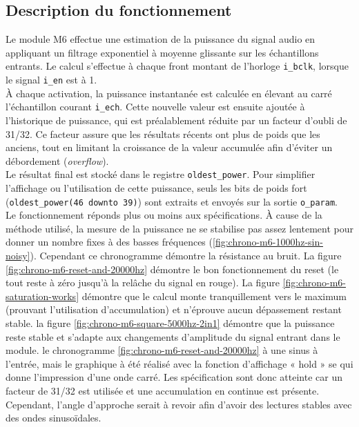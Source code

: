 

\subsection{Description du fonctionnement}

Le module M6 effectue une estimation de la puissance du signal audio en
appliquant un filtrage exponentiel à moyenne glissante sur les échantillons
entrants. Le calcul s'effectue à chaque front montant de l'horloge
\verb|i_bclk|, lorsque le signal \verb|i_en| est à 1. \\

À chaque activation, la puissance instantanée est calculée en élevant au
carré l'échantillon courant \verb|i_ech|. Cette nouvelle valeur est ensuite
ajoutée à l'historique de puissance, qui est préalablement réduite par un
facteur d'oubli de 31/32. Ce facteur assure que les résultats récents ont
plus de poids que les anciens, tout en limitant la croissance de la valeur
accumulée afin d'éviter un débordement (\emph{overflow}). \\

Le résultat final est stocké dans le registre \verb|oldest_power|. Pour
simplifier l'affichage ou l'utilisation de cette puissance, seuls les bits de
poids fort (\verb|oldest_power(46 downto 39)|) sont extraits et envoyés sur
la sortie \verb|o_param|. \\

Le fonctionnement réponds plus ou moins aux spécifications. 
À cause de la méthode utilisé, la mesure de la puissance ne se stabilise pas assez lentement pour donner un nombre fixes 
à des basses fréquences (\ref{fig:chrono-m6-1000hz-sin-noisy}). Cependant ce chronogramme démontre la résistance au bruit. 
La figure \ref{fig:chrono-m6-reset-and-20000hz} démontre le bon fonctionnement du reset (le tout reste à zéro jusqu’à la relâche du signal en rouge). 
La figure \ref{fig:chrono-m6-saturation-works} démontre que le calcul monte tranquillement vers le maximum (prouvant l'utilisation d'accumulation)
et n'éprouve aucun dépassement restant stable. la figure \ref{fig:chrono-m6-square-5000hz-2in1} démontre que la puissance reste stable et s'adapte 
aux changements d'amplitude du signal entrant dans le module. le chronogramme \ref{fig:chrono-m6-reset-and-20000hz} à une sinus à l'entrée, mais le graphique
à été réalisé avec la fonction d'affichage « hold » se qui donne l'impression d'une onde carré. Les spécification sont 
donc atteinte car un facteur de 31/32 est utilisée et une accumulation en continue est présente. Cependant, l'angle d'approche
serait à revoir afin d'avoir des lectures stables avec des ondes sinusoïdales.


